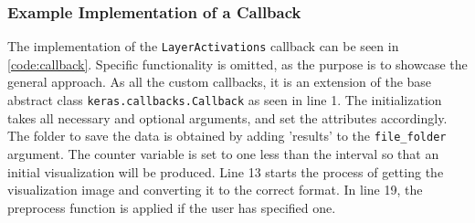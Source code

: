 
\subsubsection{Example Implementation of a Callback}

The implementation of the \texttt{LayerActivations} callback can be seen in \autoref{code:callback}. Specific functionality is omitted, as the purpose is to showcase the general approach. As all the custom callbacks, it is an extension of the base abstract class \texttt{keras.callbacks.Callback} as seen in line 1. The initialization takes all necessary and optional arguments, and set the attributes accordingly. The folder to save the data is obtained by adding 'results' to the \texttt{file\_folder} argument. The counter variable is set to one less than the interval so that an initial visualization will be produced. Line 13 starts the process of getting the visualization image and converting it to the correct format. In line 19, the preprocess function is applied if the user has specified one. \\

